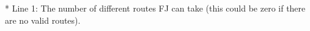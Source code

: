 * Line 1: The number of different routes FJ can take (this could be         zero if there are no valid routes).